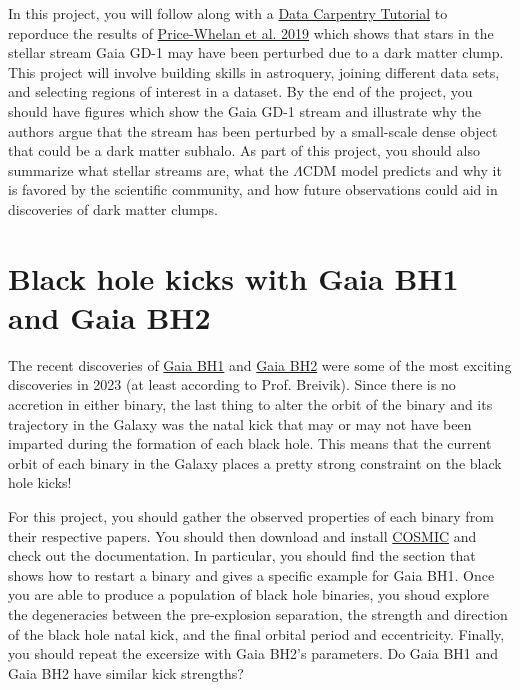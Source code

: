 \documentclass[10pt]{extarticle}
\begin{document}
In this project, you will follow along with a
\href{https://datacarpentry.org/astronomy-python/}{Data Carpentry Tutorial} to
reporduce the results of
\href{https://ui.adsabs.harvard.edu/abs/2018ApJ...863L..20P/abstract}{Price-Whelan
et al. 2019} which shows that stars in the stellar stream Gaia GD-1 may have
been perturbed due to a dark matter clump. This project will involve building
skills in astroquery, joining different data sets, and selecting regions of
interest in a dataset. By the end of the project, you should have figures which
show the Gaia GD-1 stream and illustrate why the authors argue that the stream
has been perturbed by a small-scale dense object that could be a dark matter
subhalo. As part of this project, you should also summarize what stellar streams
are, what the $\Lambda$CDM model predicts and why it is favored by the
scientific community, and how future observations could aid in discoveries of
dark matter clumps.



\section{Black hole kicks with Gaia BH1 and Gaia BH2}
The recent discoveries of
\href{https://ui.adsabs.harvard.edu/abs/2023MNRAS.518.1057E/abstract}{Gaia BH1}
and \href{https://ui.adsabs.harvard.edu/abs/2023MNRAS.521.4323E/abstract}{Gaia
BH2} were some of the most exciting discoveries in 2023 (at least according to
Prof. Breivik). Since there is no accretion in either binary, the last thing to
alter the orbit of the binary and its trajectory in the Galaxy was the natal
kick that may or may not have been imparted during the formation of each black
hole. This means that the current orbit of each binary in the Galaxy places a
pretty strong constraint on the black hole kicks!

For this project, you should gather the observed properties of each binary from
their respective papers. You should then download and install
\href{https://cosmic-popsynth.github.io}{COSMIC} and check out the
documentation. In particular, you should find the section that shows how to
restart a binary and gives a specific example for Gaia BH1. Once you are able to
produce a population of black hole binaries, you shoud explore the degeneracies
between the pre-explosion separation, the strength and direction of the black
hole natal kick, and the final orbital period and eccentricity. Finally, you
should repeat the excersize with Gaia BH2's parameters. Do Gaia BH1 and Gaia BH2
have similar kick strengths?
\end{document}
